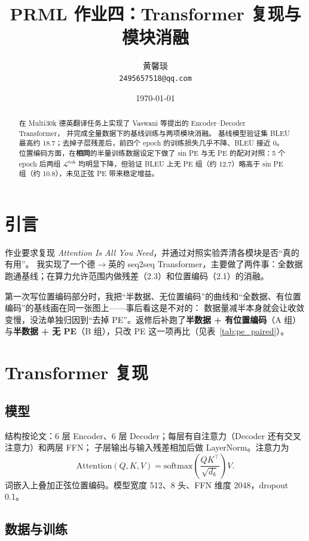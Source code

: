 \documentclass[UTF8,a4paper,11pt]{ctexart}
\title{PRML 作业四：Transformer 复现与模块消融}
\author{黄馨琰 \\ \small \texttt{2495657518@qq.com}}
\date{\today}
\newcommand{\Lt}{\mathcal{L}^{\mathrm{tok}}}
\begin{document}
\onehalfspacing
\maketitle

\begin{abstract}
在 Multi30k 德英翻译任务上实现了 Vaswani 等提出的 Encoder--Decoder Transformer，
并完成全量数据下的基线训练与两项模块消融。
基线模型验证集 BLEU 最高约 18.7；去掉子层残差后，前四个 epoch 的训练损失几乎不降、BLEU 接近 0。
位置编码方面，在\textbf{相同}的半量训练数据设定下做了 sin PE 与无 PE 的配对对照：5 个 epoch 后两组 $\Lt$ 均明显下降，但验证 BLEU 上无 PE 组（约 12.7）略高于 sin PE 组（约 10.8），未见正弦 PE 带来稳定增益。
\end{abstract}

\section{引言}

作业要求复现 \emph{Attention Is All You Need}，并通过对照实验弄清各模块是否“真的有用”。
我实现了一个德$\to$英的 seq2seq Transformer，主要做了两件事：全数据跑通基线；在算力允许范围内做残差（2.3）和位置编码（2.1）的消融。

第一次写位置编码部分时，我把“半数据、无位置编码”的曲线和“全数据、有位置编码”的基线画在同一张图上——事后看这是不对的：
数据量减半本身就会让收敛变慢，没法单独归因到“去掉 PE”。返修后补跑了\textbf{半数据 + 有位置编码}（A 组）与\textbf{半数据 + 无 PE}（B 组），只改 PE 这一项再比（见表~\ref{tab:pe_paired}）。

\section{Transformer 复现}

\subsection{模型}

结构按论文：6 层 Encoder、6 层 Decoder；每层有自注意力（Decoder 还有交叉注意力）和两层 FFN；
子层输出与输入残差相加后做 LayerNorm。注意力为
\begin{equation}
  \mathrm{Attention}(Q,K,V)=\mathrm{softmax}\!\left(\frac{QK^\top}{\sqrt{d_k}}\right)V .
\end{equation}
词嵌入上叠加正弦位置编码。模型宽度 512、8 头、FFN 维度 2048，dropout 0.1。

\subsection{数据与训练}
\end{document}

